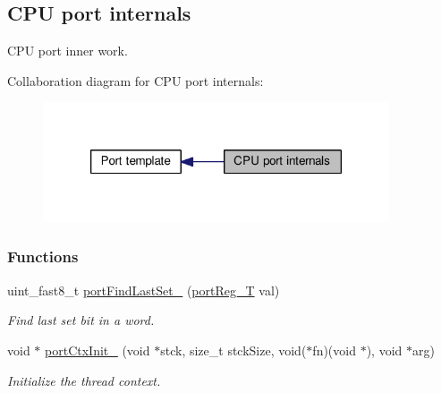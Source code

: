 \hypertarget{group__template__cpu__impl}{\subsection{C\-P\-U port internals}
\label{group__template__cpu__impl}
}


C\-P\-U port inner work.  


Collaboration diagram for C\-P\-U port internals\-:\nopagebreak
\begin{figure}[H]
\begin{center}
\leavevmode
\includegraphics[width=290pt]{group__template__cpu__impl}
\end{center}
\end{figure}
\subsubsection*{Functions}
\begin{DoxyCompactItemize}
\item 
uint\-\_\-fast8\-\_\-t \hyperlink{group__template__cpu__impl_ga548cbf806bfd34904f60a1f8db0ce965}{port\-Find\-Last\-Set\-\_\-} (\hyperlink{group__template__cpu__intf_ga99980ab56ce9857e7380210d12e3d41f}{port\-Reg\-\_\-\-T} val)
\begin{DoxyCompactList}\small\item\em Find last set bit in a word. \end{DoxyCompactList}\item 
void $\ast$ \hyperlink{group__template__cpu__impl_ga91a1dc500f743c80ec573148a99add67}{port\-Ctx\-Init\-\_\-} (void $\ast$stck, size\-\_\-t stck\-Size, void($\ast$fn)(void $\ast$), void $\ast$arg)
\begin{DoxyCompactList}\small\item\em Initialize the thread context. \end{DoxyCompactList}\end{DoxyCompactItemize}
